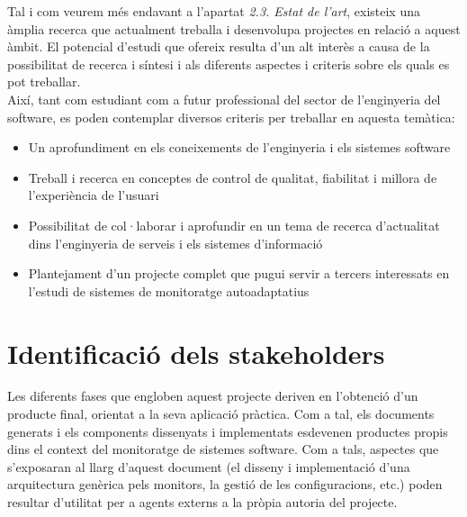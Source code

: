 Tal i com veurem més endavant a l'apartat \textit{2.3. Estat de l'art}, existeix una àmplia recerca que actualment treballa i desenvolupa projectes en relació a aquest àmbit. El potencial d'estudi que ofereix resulta d'un alt interès a causa de la possibilitat de recerca i síntesi i als diferents aspectes i criteris sobre els quals es pot treballar.\\

Així, tant com estudiant com a futur professional del sector de l'enginyeria del software, es poden contemplar diversos criteris per treballar en aquesta temàtica:
\begin{itemize}
\item Un aprofundiment en els coneixements de l'enginyeria i els sistemes software
\item Treball i recerca en conceptes de control de qualitat, fiabilitat i millora de l'experiència de l'usuari
\item Possibilitat de col·laborar i aprofundir en un tema de recerca d'actualitat dins l'enginyeria de serveis i els sistemes d'informació
\item Plantejament d'un projecte complet que pugui servir a tercers interessats en l'estudi de sistemes de monitoratge autoadaptatius
\end{itemize}  

\section{Identificació dels stakeholders}

Les diferents fases que engloben aquest projecte deriven en l'obtenció d'un producte final, orientat a la seva aplicació pràctica. Com a tal, els documents generats i els components dissenyats i implementats esdevenen productes propis dins el context del monitoratge de sistemes software. Com a tals, aspectes que s'exposaran al llarg d'aquest document (el disseny i implementació d'una arquitectura genèrica pels monitors, la gestió de les configuracions, etc.) poden resultar d'utilitat per a agents externs a la pròpia autoria del projecte.\\

